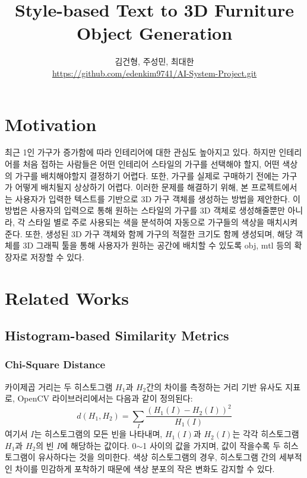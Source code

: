 \documentclass[11pt]{article}
\title{Style-based Text to 3D Furniture Object Generation}
\author{김건형, 주성민, 최대한 \\
        \small{\url{https://github.com/edenkim9741/AI-System-Project.git}}}
\date{}
\begin{document}
\maketitle
\tableofcontents

\section{Motivation}
최근 1인 가구가 증가함에 따라 인테리어에 대한 관심도 높아지고 있다. 하지만 인테리어를 처음 접하는 사람들은 어떤 인테리어 스타일의 가구를 선택해야 할지, 어떤 색상의 가구를 배치해야할지 결정하기 어렵다. 또한, 가구를 실제로 구매하기 전에는 가구가 어떻게 배치될지 상상하기 어렵다. 이러한 문제를 해결하기 위해, 본 프로젝트에서는 사용자가 입력한 텍스트를 기반으로 3D 가구 객체를 생성하는 방법을 제안한다. 이 방법은 사용자의 입력으로 통해 원하는 스타일의 가구를 3D 객체로 생성해줄뿐만 아니라, 각 스타일 별로 주로 사용되는 색을 분석하여 자동으로 가구들의 색상을 매치시켜준다. 또한, 생성된 3D 가구 객체와 함께 가구의 적절한 크기도 함께 생성되며, 해당 객체를 3D 그래픽 툴을 통해 사용자가 원하는 공간에 배치할 수 있도록 obj, mtl 등의 확장자로 저장할 수 있다.

\section{Related Works}

\subsection{Histogram-based Similarity Metrics}
\subsubsection{Chi-Square Distance}
카이제곱 거리는 두 히스토그램 $H_1$과 $H_2$간의 차이를 측정하는 거리 기반 유사도 지표로, OpenCV 라이브러리\cite{opencv_library}에서는 다음과 같이 정의된다:
\begin{equation*}
    d(H_1, H_2) = \sum_{I} \frac{(H_1(I) - H_2(I))^2}{H_1(I)}
\end{equation*}
여기서 $I$는 히스토그램의 모든 빈을 나타내며, $H_1(I)$과 $H_2(I)$는 각각 히스토그램 $H_1$과 $H_2$의 빈 $I$에 해당하는 값이다. 0$\sim$1 사이의 값을 가지며, 값이 작을수록 두 히스토그램이 유사하다는 것을 의미한다. 색상 히스토그램의 경우, 히스토그램 간의 세부적인 차이를 민감하게 포착하기 때문에 색상 분포의 작은 변화도 감지할 수 있다.
\end{document}
